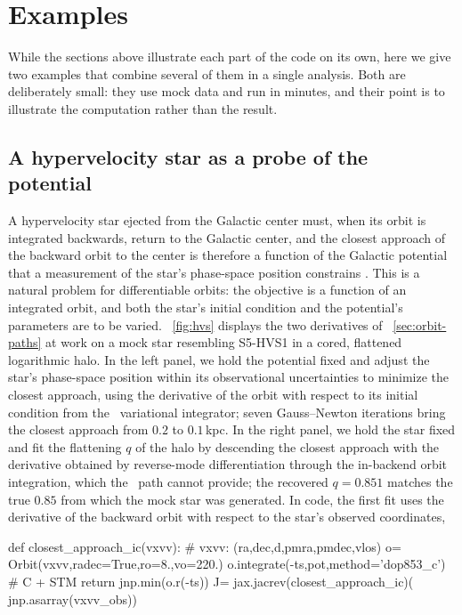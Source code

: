 \section{Examples}\label{sec:examples}

While the sections above illustrate each part of the code on its own,
here we give two examples that combine several of them in a single
analysis. Both are deliberately small:
they use mock data and run in minutes, and their point is to illustrate
the computation rather than the result.

\subsection{A hypervelocity star as a probe of the potential}\label{sec:examples-hvs}

A hypervelocity star ejected from the Galactic center must, when its
orbit is integrated backwards, return to the Galactic center, and the
closest approach of the backward orbit to the center is therefore a
function of the Galactic potential that a measurement of the star's
phase-space position constrains \citep[see, \eg,][]{Gnedin2005,Contigiani2019}.
This is a natural problem for differentiable orbits: the objective is
a function of an integrated orbit, and both the star's initial
condition and the potential's parameters are to be varied.
\figurename~\ref{fig:hvs} displays the two derivatives of
\sectionname~\ref{sec:orbit-paths} at work on a mock star resembling
S5-HVS1 \citep{Koposov2020} in a cored, flattened logarithmic halo. In the left panel, we
hold the potential fixed and adjust the star's phase-space position
within its observational uncertainties to minimize the closest approach,
using the derivative of the orbit with respect to its initial condition
from the \cc\ variational integrator; seven Gauss--Newton iterations
bring the closest approach from $0.2$ to $0.1$\,kpc. In the right
panel, we hold the star fixed and fit the flattening $q$ of the halo by
descending the closest approach with the derivative obtained by
reverse-mode differentiation through the in-backend orbit integration,
which the \cc\ path cannot provide; the recovered $q=0.851$ matches the
true $0.85$ from which the mock star was generated. In code, the first fit uses the derivative of the backward orbit with
respect to the star's observed coordinates,
\begin{code}
def closest_approach_ic(vxvv):
    # vxvv: (ra,dec,d,pmra,pmdec,vlos)
    o= Orbit(vxvv,radec=True,ro=8.,vo=220.)
    o.integrate(-ts,pot,method='dop853_c') # C + STM
    return jnp.min(o.r(-ts))
J= jax.jacrev(closest_approach_ic)(
    jnp.asarray(vxvv_obs))
\end{code}
